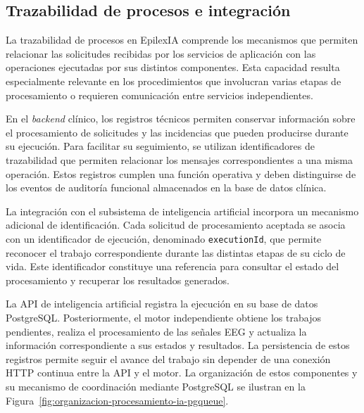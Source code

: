 

\subsection{Trazabilidad de procesos e integración}
\label{subsec:trazabilidad-procesos-integracion}

La trazabilidad de procesos en EpilexIA comprende los mecanismos
que permiten relacionar las solicitudes recibidas por los
servicios de aplicación con las operaciones ejecutadas por
sus distintos componentes. Esta capacidad resulta especialmente
relevante en los procedimientos que involucran varias etapas
de procesamiento o requieren comunicación entre servicios
independientes.

En el \textit{backend} clínico, los registros técnicos permiten
conservar información sobre el procesamiento de solicitudes
y las incidencias que pueden producirse durante su ejecución.
Para facilitar su seguimiento, se utilizan identificadores
de trazabilidad que permiten relacionar los mensajes
correspondientes a una misma operación. Estos registros
cumplen una función operativa y deben distinguirse de los
eventos de auditoría funcional almacenados en la base de
datos clínica.

La integración con el subsistema de inteligencia artificial
incorpora un mecanismo adicional de identificación. Cada
solicitud de procesamiento aceptada se asocia con un
identificador de ejecución, denominado
\texttt{executionId}, que permite reconocer el trabajo
correspondiente durante las distintas etapas de su ciclo
de vida. Este identificador constituye una referencia
para consultar el estado del procesamiento y recuperar
los resultados generados.

La API de inteligencia artificial registra la ejecución
en su base de datos PostgreSQL. Posteriormente, el motor
independiente obtiene los trabajos pendientes, realiza
el procesamiento de las señales EEG y actualiza la
información correspondiente a sus estados y resultados.
La persistencia de estos registros permite seguir
el avance del trabajo sin depender de una conexión
HTTP continua entre la API y el motor. La organización
de estos componentes y su mecanismo de coordinación
mediante PostgreSQL se ilustran en la
Figura~\ref{fig:organizacion-procesamiento-ia-pgqueue}.



